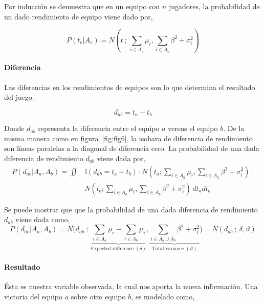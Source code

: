 \documentclass[11pt,twoside, spanish]{report} %
\begin{document}
Por inducci\'on se demuestra que en un equipo con $n$ jugadores, la probabilidad de un dado rendimiento de equipo viene dado por,

\begin{equation}
P(t_e|A_e) = N\left(t\,;\,\sum_{i\in A_e} \mu_i,\sum_{i\in A_e} \beta^2 + \sigma_i^2\right)
\end{equation}

\paragraph{Diferencia}

Las diferencias en los rendimientos de equipos son lo que determina el resultado del juego.

\begin{equation}
d_{ab}=t_a - t_b
\end{equation}

Donde $d_{ab}$ representa la diferencia entre el equipo $a$ versus el equipo $b$.
De la misma manera como en figura~\ref{fig:fig6}, la isobara de diferencia de rendimiento son l\'ineas paralelas a la diagonal de diferencia cero.
La probabilidad de una dada diferencia de rendimiento $d_ {ab}$ viene dada por,
\begin{align}\label{eq:mensajeCum}
P(d_{ab}|A_a,A_b) = \iint & \mathbb{I}(d_{ab}=t_a -t_b)\cdot N(t_a;\sum_{i\in A_a} \mu_i,\sum_{i\in A_a} \beta^2 + \sigma_i^2) \cdot \nonumber \\
& N(t_b;\sum_{i\in A_b} \mu_i,\sum_{i\in A_b} \beta^2 + \sigma_i^2) \, dt_a dt_b
\end{align}

Se puede mostrar que que la probabilidad de una dada diferencia de rendimiento $d_ {ab} $ viene dada como,
\begin{equation}\label{eq:proba_handicap}
P(d_{ab}|A_a,A_b) = N\Bigg(d_{ab} \ ; \  \underbrace{\sum_{i\in A_a} \mu_i - \sum_{i\in A_b} \mu_i}_{\text{Expected difference }(\delta)},\underbrace{\sum_{i\in A_a\cup A_b} \beta^2 + \sigma_i^2}_{\text{Total variance }(\vartheta)}\Bigg) = N(d_{ab} \ ; \  \delta, \vartheta )
\end{equation}


\paragraph{Resultado}

\'Esta es nuestra variable observada, la cual nos aporta la nueva informaci\'on.
Una victoria del equipo $ a $ sobre otro equipo $ b $, es modelado como,
\end{document}
